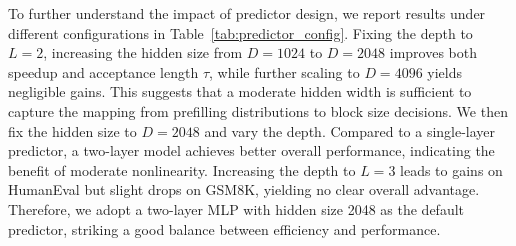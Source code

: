 \documentclass{article}
\begin{document}
\begin{table}
\vspace{-8pt}
\centering
\scriptsize
\setlength{\tabcolsep}{3.2pt}
\renewcommand{\arraystretch}{1.03}
\caption{Speedup and acceptance length ($\tau$) under different predictor configurations.}
\label{tab:predictor_config}
\vspace{-8pt}
\end{table}

To further understand the impact of predictor design, we report results under different configurations in Table~\ref{tab:predictor_config}. Fixing the depth to $L=2$, increasing the hidden size from $D=1024$ to $D=2048$ improves both speedup and acceptance length $\tau$, while further scaling to $D=4096$ yields negligible gains. This suggests that a moderate hidden width is sufficient to capture the mapping from prefilling distributions to block size decisions. We then fix the hidden size to $D=2048$ and vary the depth. Compared to a single-layer predictor, a two-layer model achieves better overall performance, indicating the benefit of moderate nonlinearity. Increasing the depth to $L=3$ leads to gains on HumanEval but slight drops on GSM8K, yielding no clear overall advantage. Therefore, we adopt a two-layer MLP with hidden size 2048 as the default predictor, striking a good balance between efficiency and performance.
\end{document}
